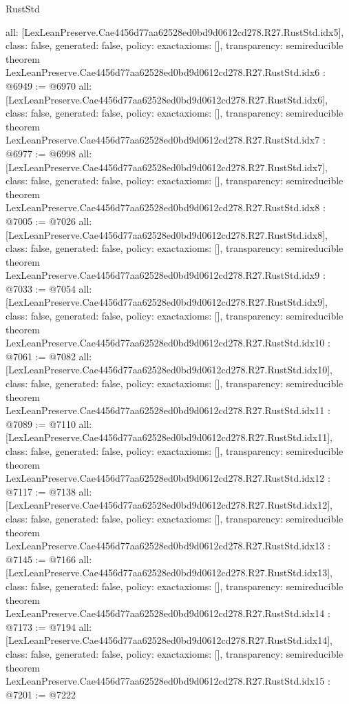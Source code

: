 \begin{lexlean}{RustStd}
\begin{coremodule}
{  all: [LexLeanPreserve.Cae4456d77aa62528ed0bd9d0612cd278.R27.RustStd.idx5],
  class: false,
  generated: false,
  policy: exact{axioms: []},
  transparency: semireducible
}
theorem LexLeanPreserve.Cae4456d77aa62528ed0bd9d0612cd278.R27.RustStd.idx6 : @6949 := @6970 {
  all: [LexLeanPreserve.Cae4456d77aa62528ed0bd9d0612cd278.R27.RustStd.idx6],
  class: false,
  generated: false,
  policy: exact{axioms: []},
  transparency: semireducible
}
theorem LexLeanPreserve.Cae4456d77aa62528ed0bd9d0612cd278.R27.RustStd.idx7 : @6977 := @6998 {
  all: [LexLeanPreserve.Cae4456d77aa62528ed0bd9d0612cd278.R27.RustStd.idx7],
  class: false,
  generated: false,
  policy: exact{axioms: []},
  transparency: semireducible
}
theorem LexLeanPreserve.Cae4456d77aa62528ed0bd9d0612cd278.R27.RustStd.idx8 : @7005 := @7026 {
  all: [LexLeanPreserve.Cae4456d77aa62528ed0bd9d0612cd278.R27.RustStd.idx8],
  class: false,
  generated: false,
  policy: exact{axioms: []},
  transparency: semireducible
}
theorem LexLeanPreserve.Cae4456d77aa62528ed0bd9d0612cd278.R27.RustStd.idx9 : @7033 := @7054 {
  all: [LexLeanPreserve.Cae4456d77aa62528ed0bd9d0612cd278.R27.RustStd.idx9],
  class: false,
  generated: false,
  policy: exact{axioms: []},
  transparency: semireducible
}
theorem LexLeanPreserve.Cae4456d77aa62528ed0bd9d0612cd278.R27.RustStd.idx10 : @7061 := @7082 {
  all: [LexLeanPreserve.Cae4456d77aa62528ed0bd9d0612cd278.R27.RustStd.idx10],
  class: false,
  generated: false,
  policy: exact{axioms: []},
  transparency: semireducible
}
theorem LexLeanPreserve.Cae4456d77aa62528ed0bd9d0612cd278.R27.RustStd.idx11 : @7089 := @7110 {
  all: [LexLeanPreserve.Cae4456d77aa62528ed0bd9d0612cd278.R27.RustStd.idx11],
  class: false,
  generated: false,
  policy: exact{axioms: []},
  transparency: semireducible
}
theorem LexLeanPreserve.Cae4456d77aa62528ed0bd9d0612cd278.R27.RustStd.idx12 : @7117 := @7138 {
  all: [LexLeanPreserve.Cae4456d77aa62528ed0bd9d0612cd278.R27.RustStd.idx12],
  class: false,
  generated: false,
  policy: exact{axioms: []},
  transparency: semireducible
}
theorem LexLeanPreserve.Cae4456d77aa62528ed0bd9d0612cd278.R27.RustStd.idx13 : @7145 := @7166 {
  all: [LexLeanPreserve.Cae4456d77aa62528ed0bd9d0612cd278.R27.RustStd.idx13],
  class: false,
  generated: false,
  policy: exact{axioms: []},
  transparency: semireducible
}
theorem LexLeanPreserve.Cae4456d77aa62528ed0bd9d0612cd278.R27.RustStd.idx14 : @7173 := @7194 {
  all: [LexLeanPreserve.Cae4456d77aa62528ed0bd9d0612cd278.R27.RustStd.idx14],
  class: false,
  generated: false,
  policy: exact{axioms: []},
  transparency: semireducible
}
theorem LexLeanPreserve.Cae4456d77aa62528ed0bd9d0612cd278.R27.RustStd.idx15 : @7201 := @7222 {
}
\end{coremodule}
\end{lexlean}
